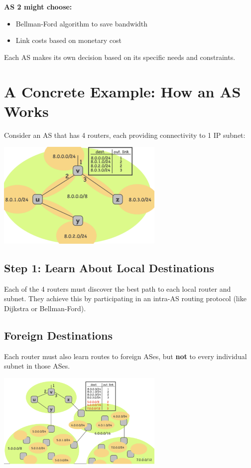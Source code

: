 \documentclass[../../compsys.tex]{subfiles}
\begin{document}
\textbf{AS 2 might choose:}
\begin{itemize}
    \item Bellman-Ford algorithm to save bandwidth
    \item Link costs based on monetary cost
\end{itemize}

Each AS makes its own decision based on its specific needs and constraints.

\section{A Concrete Example: How an AS Works}
Consider an AS that has 4 routers, each providing connectivity to 1 IP subnet:

\begin{center}
    \includegraphics[width=0.6\textwidth]{images/example-as.png}
\end{center}

\subsection{Step 1: Learn About Local Destinations}
Each of the 4 routers must discover the best path to each local router and subnet. They achieve this by participating in an intra-AS routing protocol (like Dijkstra or Bellman-Ford).

\subsection{Foreign Destinations}
Each router must also learn routes to foreign ASes, but \textbf{not} to every individual subnet in those ASes.

\begin{center}
    \includegraphics[width=0.6\textwidth]{images/example-as-2.png}
\end{center}
\end{document}
